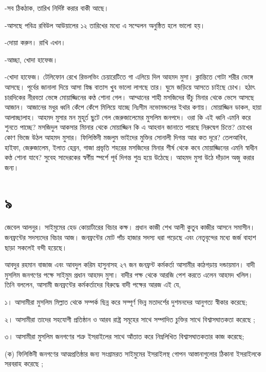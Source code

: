 \documentclass[
]{book}
\begin{document}
-সব ঠিকঠাক, তারিখ নির্দিষ্ট করার বাকী আছে।

-আসছে পবিত্র রবিউল আউয়ালের ১২ তারিখের মধ্যে এ সম্মেলন অনুষ্ঠিত হলে ভালো হয়।

-দোয়া করুন। রাখি এখন।

-আচ্ছা, খোদা হাফেজ।

-খোদা হাফেজ। টেলিফোন রেখে রিভলভিং চেয়ারেটিতে গা এলিয়ে দিল আহমদ মুসা। ক্লান্তিতে গোটা শরীর ভেঙ্গে আসছে। পূর্বের জানালা দিয়ে আসা স্নিন্ধ বাতাস খু্ব ভালো লাগছে তার। ঘুমে জড়িয়ে আসতে চাইছে চোখ। হঠাৎ চারদিকের নীরবতা ভেঙ্গে মোয়াজ্জিনের কণ্ঠ শোনা গেল। আম্মানের শাহী মসজিদের উঁচু মিনার থেকে ভেসে আসছে আজান। আজানের মধুর ধ্বনি কেঁপে কেঁপে মিলিয়ে যাচ্ছে নিঃসীম নভোমন্ডলের ইথার কণায়। মোয়াজ্জিন ডাকল, হায়া আলাচ্ছালাহ। আহমদ মুসার মন মুহূর্ত ছুটে গেল জেরুজালেমের মুসলিম জনপদে। ওরা কি এই ধ্বনি এমনি করে শুনতে পাচ্ছে? মসজিদুল আকসার মিানার থেকে মোয়াজ্জিন কি এ আহবান জানাতে পারছে নিরুদ্বেগ চিত্তে? চোখের কোণ ভিজে উঠল আহমদ মুসার। ফিলিস্তিনী মজলুম ভাইদের মুক্তির সোনালী দিগন্ত আর কত দূরে? তেলআবিব, হাইফা, জেরুজালেম, ইলাত হেব্রন, গাজা প্রভৃতি শহরের মসজিদের মিনার শীর্ষ থেকে কবে মোয়াজ্জিনের এমনি স্বাধীন কণ্ঠ শোনা যাবে? সুবেহ সাদেরকের স্বর্গীয় স্পর্শে পূর্ব দিগন্ত শুভ্র হয়ে উঠেছে। আহমদ মুসা উঠে দাঁড়াল অজু করার জন্য।

\section*{৯}\label{ota-1-9}

জেবেল আলনুর। সাইমুমের হেড কোয়ার্টারের বিচার কক্ষ। প্রধান কাজী শেখ আলী কুতুব কাজীর আসনে সমাসীন। জনফ্রন্টের সদস্যদের বিচার আজ। জনফ্রন্টের মোট পাঁচ হাজার সদস্য ধরা পড়েছে এবং নেতৃবৃন্দের মধ্যে জর্জ বাহাশ ছাড়া সকলেই বন্দী হয়েছে।

আবদুর রহমান বাজাজ এবং আবদুল করিম হাসুনাসহ ২৭ জন জনফ্রন্ট কর্মকর্তা আসামীর কাঠগড়ায় দন্ডায়মান। বাদী মুসলিম জনগণের পক্ষে সাইমুম প্রধান আহমদ মুসা। বাদীর পক্ষ থেকে আরজি পেশ করতে এলেন আহমদ খলিল। তিনি বললেন, আসামী জনফ্রন্টের কর্মকর্তাদের বিরুদ্ধে বাদী পক্ষের আরজ এই যে,

১। আসামীরা মুসলিম মিল্লাত থেকে সম্পর্ক ছিন্ন করে সম্পূর্ণ ভিন্ন মতাদর্শের দুশমনদের আনুগত্য স্বীকার করেছে;

২। আসামীরা তাদের সহযোগী প্রতিষ্ঠান ও আরব রাষ্ট্র সমূহের সাথে সম্পাদিত চুক্তির সাথে বিশ্বাসঘাতকতা করেছে ;

৩। আসামীরা মুসলিম জনগণের শত্রু ইসরাইলের সাথে আঁতাত করে নিম্নলিখিত বিশ্বাসঘাতকতার কাজ করেছে;

(ক) ফিলিস্তিনী জনগণের আত্মপ্রতিষ্ঠার জন্য সংগ্রামরত সাইমুমের ইসরাইলস্থ গোপন আস্তানাগুলোর ঠিকানা ইসরাইলকে সরবরাহ করেছে ;
\end{document}
